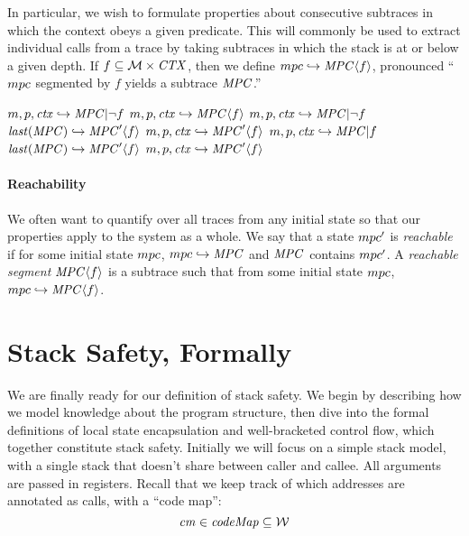 \documentclass[acmsmall,review,anonymous]{acmart}\settopmatter{printfolios=true,printccs=false,printacmref=false}
\begin{document}
In particular, we wish to formulate properties about consecutive subtraces
in which the context obeys a given predicate. This will commonly be used to extract
individual calls from a trace by taking subtraces in which the stack is
at or below a given depth. If \(f \subseteq {\mathcal M} \times \mathit{CTX}\), then
we define \(mpc \hookrightarrow \mathit{MPC} \langle f \rangle\), pronounced
``\(mpc\) segmented by \(f\) yields a subtrace \(\mathit{MPC}\).''

\begin{center}
              {\(m,p,\mathit{ctx} \hookrightarrow \mathit{MPC} | \neg f\)}
              {\(m,p,\mathit{ctx} \hookrightarrow \mathit{MPC} \langle f \rangle\)}
%
                {\(m,p,\mathit{ctx} \hookrightarrow \mathit{MPC} | \neg f\)}
                {\(\mathit{last}(\mathit{MPC}) \hookrightarrow \mathit{MPC}' \langle f \rangle\)}
                {\(m,p,\mathit{ctx} \hookrightarrow \mathit{MPC}' \langle f \rangle\)}
%
                {\(m,p,\mathit{ctx} \hookrightarrow \mathit{MPC} | f\)}
                {\(\mathit{last}(\mathit{MPC}) \hookrightarrow \mathit{MPC}' \langle f \rangle\)}
                {\(m,p,\mathit{ctx} \hookrightarrow \mathit{MPC}' \langle f \rangle\)}
\end{center}

\paragraph*{Reachability}

We often want to quantify over all traces from any initial state so that our
properties apply to the system as a whole. We say that a state \(mpc'\)
is {\em reachable} if for some initial state \(mpc\), \(mpc \hookrightarrow \mathit{MPC}\)
and \(\mathit{MPC}\) contains \(mpc'\). A {\it reachable segment} \(\mathit{MPC} \langle f \rangle\) is a subtrace
such that from some initial state \(mpc\), \(mpc \hookrightarrow \mathit{MPC} \langle f \rangle\).

\section{Stack Safety, Formally}
\label{sec:lse}

We are finally ready for our definition of stack safety. We begin
by describing how we model knowledge about the program structure,
then dive into the formal definitions of local state encapsulation and
well-bracketed control flow, which together constitute stack safety.
Initially we will focus on a simple stack model, with a single stack
that doesn't share between caller and callee. All arguments are passed
in registers. Recall that we keep track of which addresses are
annotated as calls, with a ``code map'':
\[\mathit{cm} \in \mathit{codeMap} \subseteq {\mathcal W}\]
\end{document}
